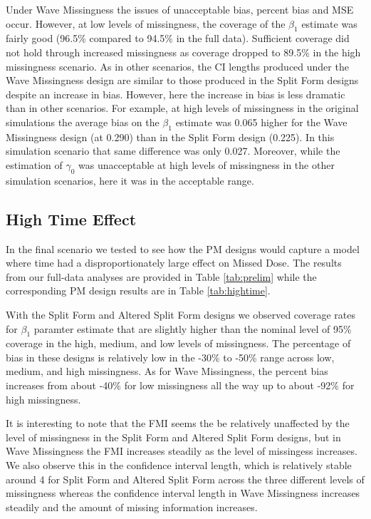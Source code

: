 \documentclass{svjour3}\usepackage[]{graphicx}\usepackage[]{color}
\begin{document}
Under Wave Missingness the issues of unacceptable bias, percent bias and MSE occur. However, at low levels of missingness, the coverage of the $\beta_1$ estimate was fairly good (96.5\% compared to 94.5\% in the full data). Sufficient coverage did not hold through increased missingness as coverage dropped to 89.5\% in the high missingness scenario. As in other scenarios, the CI lengths produced under the Wave Missingness design are similar to those produced in the Split Form designs despite an increase in bias. However, here the increase in bias is less dramatic than in other scenarios. For example, at high levels of missingness in the original simulations the average bias on the $\beta_1$ estimate was 0.065 higher for the Wave Missingness design (at 0.290) than in the Split Form design (0.225). In this simulation scenario that same difference was only 0.027. Moreover, while the estimation of $\gamma_0$ was unacceptable at high levels of missingness in the other simulation scenarios, here it was in the acceptable range.\par

\subsection{High Time Effect}
\label{sec:3.4}
In the final scenario we tested to see how the PM designs would capture a model where time had a disproportionately large effect on Missed Dose. The results from our full-data analyses are provided in Table \ref{tab:prelim} while the corresponding PM design results are in Table \ref{tab:hightime}. \par

With the Split Form and Altered Split Form designs we observed coverage rates for $\beta_1$ paramter estimate that are slightly higher than the nominal level of 95\% coverage in the high, medium, and low levels of missingness.  The percentage of bias in these designs is relatively low in the -30\% to -50\% range across low, medium, and high missingness.  As for Wave Missingness, the percent bias increases from about -40\% for low missingness all the way up to about -92\% for high missingness.  \par

It is interesting to note that the FMI seems the be relatively unaffected by the level of missingness in the Split Form and Altered Split Form designs, but in Wave Missingness the FMI increases steadily as the level of missingess increases.  We also observe this in the confidence interval length, which is relatively stable around 4 for Split Form and Altered Split Form across the three different levels of missingness whereas the confidence interval length in Wave Missingness increases steadily and the amount of missing information increases.  \par
\end{document}
